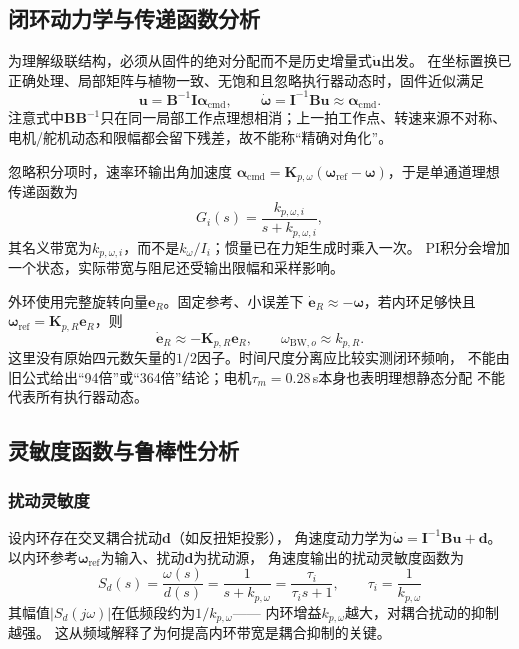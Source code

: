 
\subsection{闭环动力学与传递函数分析}
\label{sec:cascade_tf}

为理解级联结构，必须从固件的绝对分配而不是历史增量式$\dot{\mathbf u}$出发。
在坐标置换已正确处理、局部矩阵与植物一致、无饱和且忽略执行器动态时，固件近似满足
\begin{equation}
\mathbf u=\mathbf B^{-1}\mathbf I\boldsymbol\alpha_{\mathrm{cmd}},\qquad
\dot{\boldsymbol\omega}=\mathbf I^{-1}\mathbf B\mathbf u
\approx\boldsymbol\alpha_{\mathrm{cmd}} .
\label{eq:cascade_inner_dot}
\end{equation}
注意式中$\mathbf B\mathbf B^{-1}$只在同一局部工作点理想相消；上一拍工作点、转速来源不对称、
电机/舵机动态和限幅都会留下残差，故不能称“精确对角化”。

忽略积分项时，速率环输出角加速度
$\boldsymbol\alpha_{\mathrm{cmd}}=\mathbf K_{p,\omega}
(\boldsymbol\omega_{\mathrm{ref}}-\boldsymbol\omega)$，于是单通道理想传递函数为
\begin{equation}
G_i(s)=\frac{k_{p,\omega,i}}{s+k_{p,\omega,i}},
\label{eq:cascade_inner_tf}
\end{equation}
其名义带宽为$k_{p,\omega,i}$，而不是$k_\omega/I_i$；惯量已在力矩生成时乘入一次。
PI积分会增加一个状态，实际带宽与阻尼还受输出限幅和采样影响。

外环使用完整旋转向量$\mathbf e_R$。固定参考、小误差下
$\dot{\mathbf e}_R\approx-\boldsymbol\omega$，若内环足够快且
$\boldsymbol\omega_{\mathrm{ref}}=\mathbf K_{p,R}\mathbf e_R$，则
\begin{equation}
\dot{\mathbf e}_R\approx-\mathbf K_{p,R}\mathbf e_R,
\qquad \omega_{\mathrm{BW},o}\approx k_{p,R} .
\label{eq:cascade_outer_dot}
\end{equation}
这里没有原始四元数矢量的$1/2$因子。时间尺度分离应比较实测闭环频响，
不能由旧公式给出“94倍”或“364倍”结论；电机$\tau_m=0.28$\,s本身也表明理想静态分配
不能代表所有执行器动态。

\subsection{灵敏度函数与鲁棒性分析}
\label{sec:cascade_sensitivity}

\subsubsection{扰动灵敏度}

设内环存在交叉耦合扰动$\mathbf{d}$（如反扭矩投影），
角速度动力学为$\dot{\boldsymbol{\omega}}=\mathbf{I}^{-1}\mathbf{B}\mathbf{u}+\mathbf{d}$。
以内环参考$\boldsymbol{\omega}_{\mathrm{ref}}$为输入、扰动$\mathbf{d}$为扰动源，
角速度输出的扰动灵敏度函数为
\begin{equation}
    S_d(s) = \frac{\omega(s)}{d(s)} = \frac{1}{s+k_{p,\omega}}
    = \frac{\tau_i}{\tau_i s+1},\qquad \tau_i=\frac{1}{k_{p,\omega}}
    \label{eq:cascade_sens}
\end{equation}
其幅值$|S_d(j\omega)|$在低频段约为$1/k_{p,\omega}$——
内环增益$k_{p,\omega}$越大，对耦合扰动的抑制越强。
这从频域解释了为何提高内环带宽是耦合抑制的关键。

